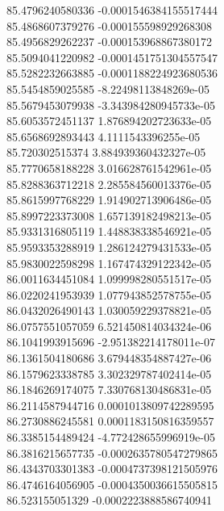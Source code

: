 {85.4796240580336 -0.0001546384155517444 \\
85.4868607379276 -0.000155598929268308 \\
85.4956829262237 -0.000153968867380172 \\
85.5094041220982 -0.0001451751304557547 \\
85.5282232663885 -0.0001188224923680536 \\
85.5454859025585 -8.22498113848269e-05 \\
85.5679453079938 -3.343984280945733e-05 \\
85.6053572451137 1.876894202723633e-05 \\
85.6568692893443 4.1111543396255e-05 \\
85.720302515374 3.884939360432327e-05 \\
85.7770658188228 3.016628761542961e-05 \\
85.8288363712218 2.285584560013376e-05 \\
85.8615997768229 1.914902713906486e-05 \\
85.8997223373008 1.657139182498213e-05 \\
85.9331316805119 1.448838338546921e-05 \\
85.9593353288919 1.286124279431533e-05 \\
85.9830022598298 1.167474329122342e-05 \\
86.0011634451084 1.099998280551517e-05 \\
86.0220241953939 1.077943852578755e-05 \\
86.0432026490143 1.030059229378821e-05 \\
86.0757551057059 6.521450814034324e-06 \\
86.1041993915696 -2.951382214178011e-07 \\
86.1361504180686 3.679448354887427e-06 \\
86.1579623338785 3.302329787402414e-05 \\
86.1846269174075 7.330768130486831e-05 \\
86.2114587944716 0.0001013809742289595 \\
86.2730886245581 0.0001183150816359557 \\
86.3385154489424 -4.772428655996919e-05 \\
86.3816215657735 -0.0002635780547279865 \\
86.4343703301383 -0.0004737398121505976 \\
86.4746164056905 -0.0004350036615505815 \\
86.523155051329 -0.0002223888586740941 \\
}
